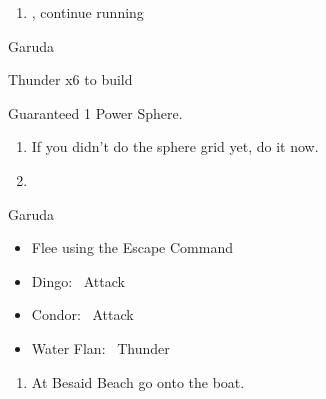 \begin{enumerate}[resume]
	\item \sd, continue running
\end{enumerate}
\begin{battle}{Garuda}
	\begin{itemize}
		\summon{\valefor}
		\valeforf Thunder x6 to build \od
	\end{itemize}
Guaranteed 1 Power Sphere.
\end{battle}
\begin{enumerate}[resume]
	\item If you didn't do the sphere grid yet, do it now.
	\item \formation{\tidus}{\yuna}{\lulu}
\end{enumerate}
\begin{battle}{Garuda}
	\begin{itemize}
		\item Flee using the Escape Command
	\end{itemize}
\end{battle}
\begin{encounters}
	\begin{itemize}
		\item Dingo: \tidus\ Attack
		\item Condor: \wakka\ Attack
		\item Water Flan: \lulu\ Thunder
	\end{itemize}
\end{encounters}
\begin{enumerate}[resume]
	\item At Besaid Beach go onto the boat.
\end{enumerate}